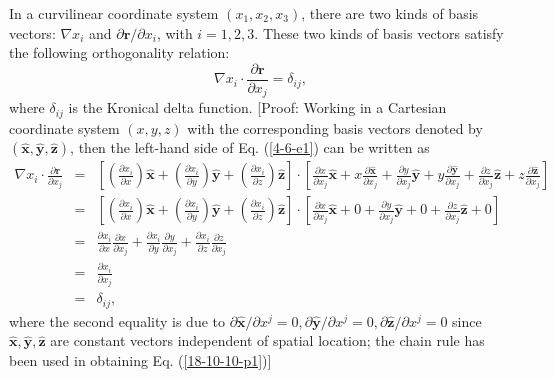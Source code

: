 \documentclass{llncs}
\begin{document}
In a curvilinear coordinate system $(x_1, x_2, x_3)$, there are two kinds of
basis vectors: $\nabla x_i$ and $\partial \mathbf{r}/ \partial x_i$, with $i =
1, 2, 3.$ These two kinds of basis vectors satisfy the following orthogonality
relation:
\begin{equation}
  \label{4-6-e1} \nabla x_i \cdot \frac{\partial \mathbf{r}}{\partial x_j} =
  \delta_{i j},
\end{equation}
where $\delta_{i j}$ is the Kronical delta function. [Proof: Working in a
Cartesian coordinate system $(x, y, z)$ with the corresponding basis vectors
denoted by $(\hat{\mathbf{x}}, \hat{\mathbf{y}}, \hat{\mathbf{z}})$, then the
left-hand side of Eq. (\ref{4-6-e1}) can be written as
\begin{eqnarray}
  \nabla x_i \cdot \frac{\partial \mathbf{r}}{\partial x_j} & = & \left[
  \left( \frac{\partial x_i}{\partial x} \right) \hat{\mathbf{x}} + \left(
  \frac{\partial x_i}{\partial y} \right) \hat{\mathbf{y}} + \left(
  \frac{\partial x_i}{\partial z} \right) \hat{\mathbf{z}} \right] \cdot
  \left[ \frac{\partial x}{\partial x_j} \hat{\mathbf{x}} + x \frac{\partial
  \hat{\mathbf{x}}}{\partial x_j} + \frac{\partial y}{\partial x_j}
  \hat{\mathbf{y}} + y \frac{\partial \hat{\mathbf{y}}}{\partial x_j} +
  \frac{\partial z}{\partial x_j} \hat{\mathbf{z}} + z \frac{\partial
  \hat{\mathbf{z}}}{\partial x_j} \right] \nonumber\\
  & = & \left[ \left( \frac{\partial x_i}{\partial x} \right)
  \hat{\mathbf{x}} + \left( \frac{\partial x_i}{\partial y} \right)
  \hat{\mathbf{y}} + \left( \frac{\partial x_i}{\partial z} \right)
  \hat{\mathbf{z}} \right] \cdot \left[ \frac{\partial x}{\partial x_j}
  \hat{\mathbf{x}} + 0 + \frac{\partial y}{\partial x_j} \hat{\mathbf{y}} + 0
  + \frac{\partial z}{\partial x_j} \hat{\mathbf{z}} + 0 \right] \\
  & = & \frac{\partial x_i}{\partial x} \frac{\partial x}{\partial x_j} +
  \frac{\partial x_i}{\partial y}  \frac{\partial y}{\partial x_j} +
  \frac{\partial x_i}{\partial z}  \frac{\partial z}{\partial x_j} \nonumber\\
  & = & \frac{\partial x_i}{\partial x_j}  \label{18-10-10-p1}\\
  & = & \delta_{i j}, \nonumber
\end{eqnarray}
where the second equality is due to $\partial \hat{\mathbf{x}} / \partial x^j
= 0, \partial \hat{\mathbf{y}} / \partial x^j = 0, \partial \hat{\mathbf{z}} /
\partial x^j = 0$ since $\hat{\mathbf{x}}, \hat{\mathbf{y}}, \hat{\mathbf{z}}$
are constant vectors independent of spatial location; the chain rule has been
used in obtaining Eq. (\ref{18-10-10-p1})]
\end{document}
